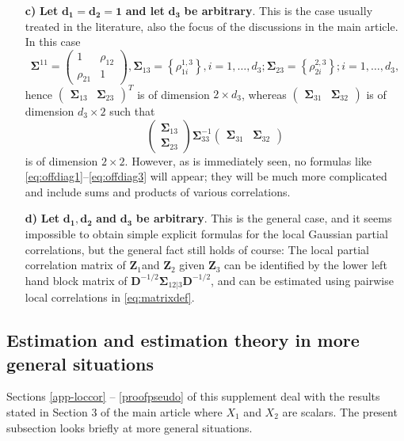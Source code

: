 \documentclass[
  12pt,
  letterpaper]{article}
\numberwithin{equation}{section}
\newcommand{\Z}{\bm{Z}}
\newcommand{\D}{\bm{D}}
\newcommand{\fSigma}{\bm{\Sigma}}
\begin{document}
\begin{itemize}
\item[\textbf{c)}] \textbf{Let} $\bm{d_1 = d_2 = 1}$ \textbf{and let} $\bm{d_3}$ \textbf{be arbitrary}. This is the case usually treated in the literature, also the focus of the discussions in the main article. In this case
$$\fSigma^{11} = \begin{pmatrix} 1 & \rho_{12} \\ \rho_{21} & 1 \end{pmatrix}, \fSigma_{13} = \left\{\rho_{1i}^{1,3}\right\}, i=1,\ldots,d_3; \fSigma_{23} = \left\{\rho_{2i}^{2,3}\right\}; i=1,\ldots,d_3,$$
hence $\begin{pmatrix} \fSigma_{13} & \fSigma_{23}\end{pmatrix}^T$ is of dimension $2\times d_3$, whereas $\begin{pmatrix} \fSigma_{31} & \fSigma_{32}\end{pmatrix}$ is of dimension $d_3\times 2$ such that
$$\begin{pmatrix} \fSigma_{13} \\ \fSigma_{23} \end{pmatrix} \fSigma_{33}^{-1} \begin{pmatrix} \fSigma_{31} & \fSigma_{32} \end{pmatrix}$$
is of dimension $2\times2$. However, as is immediately seen, no formulas like \eqref{eq:offdiag1}--\eqref{eq:offdiag3} will appear; they will be much more complicated and include sums and products of various correlations.

\item[\textbf{d)}] \textbf{Let} $\bm{d_1, d_2}$ \textbf{and} $\bm{d_3}$ \textbf{be arbitrary}. This is the general case, and it seems impossible to obtain simple explicit formulas for the local Gaussian partial correlations, but the general fact still holds of course: The local partial correlation matrix of $\Z_1$and $\Z_2$ given $\Z_3$ can be identified by the lower left hand block matrix of $\D^{-1/2}\fSigma_{12|3}\D^{-1/2}$, and can be estimated using pairwise local correlations in \eqref{eq:matrixdef}.
\end{itemize}

\hypertarget{chap:estimation}{%
\subsection{Estimation and estimation theory in more general situations}\label{chap:estimation}}

Sections \ref{app-loccor} -- \ref{proofpseudo} of this supplement deal with the results stated in Section 3 of the main article where \(X_1\) and \(X_2\) are scalars. The present subsection looks briefly at more general situations.
\end{document}
